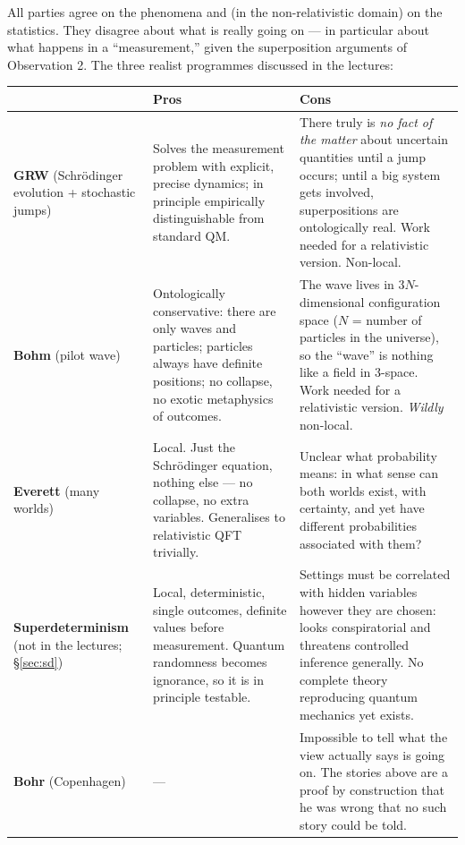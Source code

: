 \documentclass[11pt,a4paper]{article}
\theoremstyle{remark}
\begin{document}
All parties agree on the phenomena and (in the non-relativistic domain) on the
statistics. They disagree about what is really going on --- in particular about
what happens in a ``measurement,'' given the superposition arguments of
Observation 2. The three realist programmes discussed in the lectures:

\begin{center}
\renewcommand{\arraystretch}{1.35}
\begin{tabular}{>{\raggedright\arraybackslash}p{3.1cm}>{\raggedright\arraybackslash}p{5.1cm}>{\raggedright\arraybackslash}p{6.2cm}}
\toprule
 & \textbf{Pros} & \textbf{Cons}\\
\midrule
\textbf{GRW} (Schr\"odinger evolution + stochastic jumps) &
Solves the measurement problem with explicit, precise dynamics; in principle
empirically distinguishable from standard QM. &
There truly is \emph{no fact of the matter} about uncertain quantities until a
jump occurs; until a big system gets involved, superpositions are ontologically
real. Work needed for a relativistic version. Non-local.\\
\textbf{Bohm} (pilot wave) &
Ontologically conservative: there are only waves and particles; particles always
have definite positions; no collapse, no exotic metaphysics of outcomes. &
The wave lives in $3N$-dimensional configuration space ($N$ = number of particles
in the universe), so the ``wave'' is nothing like a field in 3-space. Work needed
for a relativistic version. \emph{Wildly} non-local.\\
\textbf{Everett} (many worlds) &
Local. Just the Schr\"odinger equation, nothing else --- no collapse, no extra
variables. Generalises to relativistic QFT trivially. &
Unclear what probability means: in what sense can both worlds exist, with
certainty, and yet have different probabilities associated with them?\\
\textbf{Super\-deter\-minism} (not in the lectures; \S\ref{sec:sd}) &
Local, deterministic, single outcomes, definite values before measurement.
Quantum randomness becomes ignorance, so it is in principle testable. &
Settings must be correlated with hidden variables however they are chosen:
looks conspiratorial and threatens controlled inference generally. No complete
theory reproducing quantum mechanics yet exists.\\
\textbf{Bohr} (Copenhagen) &
--- &
Impossible to tell what the view actually says is going on. The stories
above are a proof by construction that he was wrong that no such story could be
told.\\
\bottomrule
\end{tabular}
\end{center}
\end{document}
